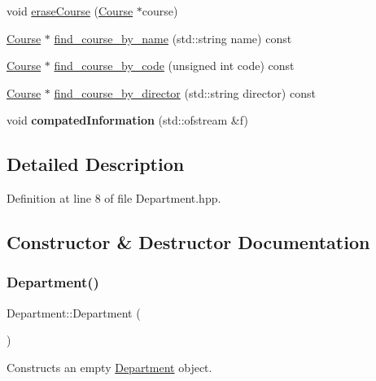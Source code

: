 \begin{DoxyCompactItemize}
\item 
void \hyperlink{classDepartment_a01acd70fa3c49ebe0d729a910c842078}{erase\+Course} (\hyperlink{classCourse}{Course} $\ast$course)
\item 
\hyperlink{classCourse}{Course} $\ast$ \hyperlink{classDepartment_a2f776e8ddcf895cccdf60beb206b8620}{find\+\_\+course\+\_\+by\+\_\+name} (std\+::string name) const
\item 
\hyperlink{classCourse}{Course} $\ast$ \hyperlink{classDepartment_af8e8a8aa806e5925c07686cadd70fde2}{find\+\_\+course\+\_\+by\+\_\+code} (unsigned int code) const
\item 
\hyperlink{classCourse}{Course} $\ast$ \hyperlink{classDepartment_a5d83db657bd838d17ac04be757f887a5}{find\+\_\+course\+\_\+by\+\_\+director} (std\+::string director) const
\item 
\mbox{\label{classDepartment_abbfb590bf8b197e23837f1c932a1c278}} 
void {\bfseries compated\+Information} (std\+::ofstream \&f)
\end{DoxyCompactItemize}


\subsection{Detailed Description}


Definition at line 8 of file Department.\+hpp.



\subsection{Constructor \& Destructor Documentation}
\mbox{\label{classDepartment_a9d85b4973d29f519e09fdafa53a56e8c}} 
\subsubsection{\texorpdfstring{Department()}{Department()}\hspace{0.1cm}{\footnotesize\ttfamily [1/2]}}
{\footnotesize\ttfamily Department\+::\+Department (\begin{DoxyParamCaption}{ }\end{DoxyParamCaption})}

Constructs an empty \hyperlink{classDepartment}{Department} object. 

